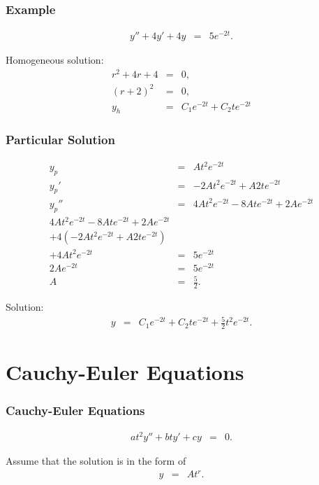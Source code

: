 \documentclass{beamer}
\newcommand{\lp}{\left(}
\newcommand{\rp}{\right)}
\begin{document}
\begin{frame}
  \frametitle{Example}

  \begin{eqnarray*}
    y'' + 4y' + 4y & = & 5 e^{-2t}.
  \end{eqnarray*}

  {
    Homogeneous solution:
    \begin{eqnarray*}
      r^2 + 4r + 4 & = & 0, \\
      (r+2)^2 & = & 0, \\
      y_h & = & C_1 e^{-2t} + C_2 t e^{-2t}
    \end{eqnarray*}
  }

\end{frame}

\begin{frame}
  \frametitle{Particular Solution}

  \begin{eqnarray*}
    y_p & = & A t^2 e^{-2t} \\
    y_p' & = & -2 A t^2 e^{-2t} + A 2t e^{-2t} \\
    y_p'' & = & 4 A t^2 e^{-2t} - 8A t e^{-2t} + 2 A e^{-2t} \\
    4 A t^2 e^{-2t} - 8A t e^{-2t} + 2 A e^{-2t} & & \\
    + 4 \lp -2 A t^2 e^{-2t} + A 2t e^{-2t} \rp & & \\
    + 4 A t^2 e^{-2t} & = & 5 e^{-2t} \\
    2 A e^{-2t} & = & 5 e^{-2t} \\
    A & = & \frac{5}{2}.
  \end{eqnarray*}

  Solution:
  \begin{eqnarray*}
    y & = & C_1 e^{-2t} + C_2 t e^{-2 t} + \frac{5}{2} t^2 e^{-2t}.
  \end{eqnarray*}

\end{frame}

\section{Cauchy-Euler Equations}

\begin{frame}
  \frametitle{Cauchy-Euler Equations}

  \begin{eqnarray*}
    a t^2 y'' + b t y' + c y & = & 0.
  \end{eqnarray*}

  {
    Assume that the solution is in the form of
    \begin{eqnarray*}
      y & = & A t^r.
    \end{eqnarray*}
  }

\end{frame}
\end{document}
